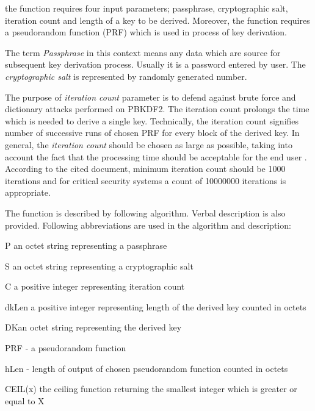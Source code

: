 \documentclass[nolof]{fithesis3}
\begin{document}
the function requires four input parameters; passphrase, cryptographic salt, iteration count and length of a key to be derived. Moreover, the function requires a pseudorandom function (PRF) which is used in process of key derivation.

The term \emph{Passphrase} in this context means any data which are source for subsequent key derivation process. Usually it is a password entered by user. The \emph{cryptographic salt} is represented by randomly generated number.

The purpose of \emph{iteration count} parameter is to defend against brute force and dictionary attacks performed on PBKDF2. The iteration count prolongs the time which is needed to derive a single key. Technically, the iteration count signifies number of successive runs of chosen PRF for every block of the derived key. In general, the \emph{iteration count} should be chosen as large as possible, taking into account the fact that the processing time should be acceptable for the end user \parencite{nistpbkdf2}. According to the cited document, minimum iteration count should be 1000 iterations and for critical security systems a count of 10000000 iterations is appropriate. 

The function is described by following algorithm. Verbal description is also provided. Following abbreviations are used in the algorithm and description:

\begin{description}
\item{P} an octet string representing a passphrase

\item{S} an octet string representing a cryptographic salt

\item{C} a positive integer representing iteration count

\item{dkLen} a positive integer representing length of the derived key counted in octets

\item{DK}an octet string representing the derived key

\item{PRF} - a pseudorandom function

\item{hLen} - length of output of chosen pseudorandom function counted in octets

\item{CEIL(x)} the ceiling function returning the smallest integer which is greater or equal to X


\end{description}
\end{document}
